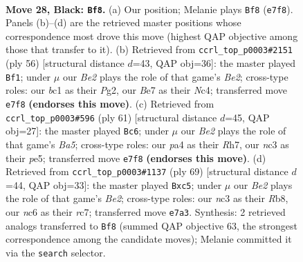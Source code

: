 \documentclass[11pt]{article}
\begin{document}
\clearpage

\begin{figure}[p]\centering
\begin{subfigure}{0.46\textwidth}\centering
\resizebox{\linewidth}{!}{%
\newchessgame
\chessboard[
  setfen={r7/p3b1k1/2N3p1/6P1/P7/2N5/1P3P2/R1B1K3 b Q - 0 28},
  showmover=false,
  pgfstyle=straightmove, color=movearrow, markmove={e7-f8}
]}
\caption{}
\end{subfigure}\hfill
\begin{subfigure}{0.46\textwidth}\centering
\resizebox{\linewidth}{!}{%
\newchessgame
\chessboard[
  setfen={8/2r1p1kp/6p1/R4b2/2N5/2n4P/4BPP1/6K1 w - - 3 29},
  showmover=false,
  pgfstyle=straightmove, color=movearrow, markmove={e2-f1}
]}
\caption{}
\end{subfigure}
\\[4pt]
\begin{subfigure}{0.46\textwidth}\centering
\resizebox{\linewidth}{!}{%
\newchessgame
\chessboard[
  setfen={8/2k2p1r/1p6/4Pp2/b2R1P2/P3B3/2P5/2K5 b - - 1 31},
  showmover=false,
  pgfstyle=straightmove, color=movearrow, markmove={a4-c6}
]}
\caption{}
\end{subfigure}\hfill
\begin{subfigure}{0.46\textwidth}\centering
\resizebox{\linewidth}{!}{%
\newchessgame
\chessboard[
  setfen={1r2k3/2R1b1p1/5p2/2Bp3p/1P6/6P1/5PK1/8 b - - 1 35},
  showmover=false,
  pgfstyle=straightmove, color=movearrow, markmove={e7-c5}
]}
\caption{}
\end{subfigure}
\caption{\textbf{Move 28, Black: \texttt{Bf8}.} (a) Our position; Melanie plays \texttt{Bf8} (\texttt{e7f8}). Panels (b)--(d) are the retrieved master positions whose correspondence most drove this move (highest QAP objective among those that transfer to it). (b) Retrieved from \texttt{ccrl\_top\_p0003\#2151} (ply 56) [structural distance $d$=43, QAP obj=36]: the master played \texttt{Bf1}; under $\mu$ our \emph{Be2} plays the role of that game's \emph{Be2}; cross-type roles: our \emph{b}c1 as their \emph{P}g2, our \emph{B}e7 as their \emph{N}c4; transferred move \texttt{e7f8} \textbf{(endorses this move)}. (c) Retrieved from \texttt{ccrl\_top\_p0003\#596} (ply 61) [structural distance $d$=45, QAP obj=27]: the master played \texttt{Bc6}; under $\mu$ our \emph{Be2} plays the role of that game's \emph{Ba5}; cross-type roles: our \emph{p}a4 as their \emph{R}h7, our \emph{n}c3 as their \emph{p}e5; transferred move \texttt{e7f8} \textbf{(endorses this move)}. (d) Retrieved from \texttt{ccrl\_top\_p0003\#1137} (ply 69) [structural distance $d$=44, QAP obj=33]: the master played \texttt{Bxc5}; under $\mu$ our \emph{Be2} plays the role of that game's \emph{Be2}; cross-type roles: our \emph{n}c3 as their \emph{R}b8, our \emph{n}c6 as their \emph{r}c7; transferred move \texttt{e7a3}. Synthesis: 2 retrieved analogs transferred to \texttt{Bf8} (summed QAP objective 63, the strongest correspondence among the candidate moves); Melanie committed it via the \texttt{search} selector.}
\label{fig:thought-m55}
\end{figure}
\end{document}
